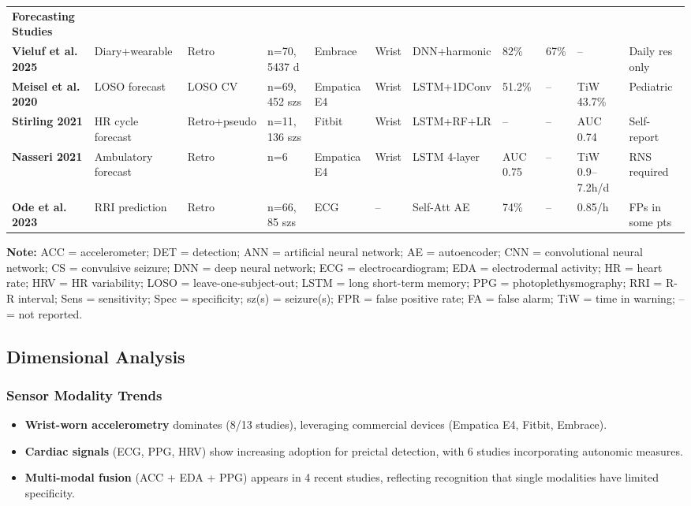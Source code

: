 \begin{landscape}
\begin{table}[htbp]
{\begin{tabular}{@{}llllllllllp{3cm}@{}}
\textbf{Forecasting Studies} \\
\addlinespace

\textbf{Vieluf et al. 2025} & Diary+wearable & Retro & n=70, 5437 d & Embrace & Wrist & DNN+harmonic & 82\% & 67\% & -- & Daily res only \\
\addlinespace

\textbf{Meisel et al. 2020} & LOSO forecast & LOSO CV & n=69, 452 szs & Empatica E4 & Wrist & LSTM+1DConv & 51.2\% & -- & TiW 43.7\% & Pediatric \\
\addlinespace

\textbf{Stirling 2021} & HR cycle forecast & Retro+pseudo & n=11, 136 szs & Fitbit & Wrist & LSTM+RF+LR & -- & -- & AUC 0.74 & Self-report \\
\addlinespace

\textbf{Nasseri 2021} & Ambulatory forecast & Retro & n=6 & Empatica E4 & Wrist & LSTM 4-layer & AUC 0.75 & -- & TiW 0.9--7.2h/d & RNS required \\
\addlinespace

\textbf{Ode et al. 2023} & RRI prediction & Retro & n=66, 85 szs & ECG & -- & Self-Att AE & 74\% & -- & 0.85/h & FPs in some pts \\
\bottomrule
\end{tabular}%
}
\par\medskip
\footnotesize
\textbf{Note:} ACC = accelerometer; DET = detection; ANN = artificial neural network; AE = autoencoder; CNN = convolutional neural network; CS = convulsive seizure; DNN = deep neural network; ECG = electrocardiogram; EDA = electrodermal activity; HR = heart rate; HRV = HR variability; LOSO = leave-one-subject-out; LSTM = long short-term memory; PPG = photoplethysmography; RRI = R-R interval; Sens = sensitivity; Spec = specificity; sz(s) = seizure(s); FPR = false positive rate; FA = false alarm; TiW = time in warning; -- = not reported.
\end{table}
\end{landscape}

\subsection{Dimensional Analysis}

\subsubsection{Sensor Modality Trends}
\begin{itemize}
  \item \textbf{Wrist-worn accelerometry} dominates (8/13 studies), leveraging commercial devices (Empatica E4, Fitbit, Embrace).
  \item \textbf{Cardiac signals} (ECG, PPG, HRV) show increasing adoption for preictal detection, with 6 studies incorporating autonomic measures.
  \item \textbf{Multi-modal fusion} (ACC + EDA + PPG) appears in 4 recent studies, reflecting recognition that single modalities have limited specificity.
\end{itemize}

